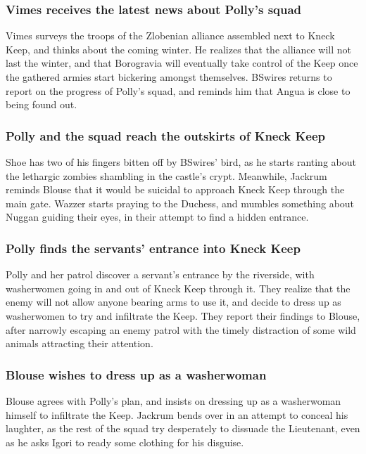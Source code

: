\subsubsection{\Gls{Vimes} receives the latest news about \Gls{Polly}'s squad}
\Gls{Vimes} surveys the troops of the Zlobenian alliance assembled next to Kneck Keep, and thinks
about the coming winter. He realizes that the alliance will not last the winter, and that
Borogravia will eventually take control of the Keep once the gathered armies start bickering amongst
themselves. \Gls{BSwires} returns to report on the progress of \Gls{Polly}'s squad, and reminds him
that \Gls{Angua} is close to being found out.

\subsubsection{\Gls{Polly} and the squad reach the outskirts of Kneck Keep}
\Gls{Shoe} has two of his fingers bitten off by \Gls{BSwires}' bird, as he starts ranting about the
lethargic zombies shambling in the castle's crypt. Meanwhile, \Gls{Jackrum} reminds \Gls{Blouse}
that it would be suicidal to approach Kneck Keep through the main gate. \Gls{Wazzer} starts praying
to the \Gls{Duchess}, and mumbles something about \Gls{Nuggan} guiding their eyes, in their attempt
to find a hidden entrance.

\subsubsection{\Gls{Polly} finds the servants' entrance into Kneck Keep}
\Gls{Polly} and her patrol discover a servant's entrance by the riverside, with washerwomen
going in and out of Kneck Keep through it. They realize that the enemy will not allow anyone bearing
arms to use it, and decide to dress up as washerwomen to try and infiltrate the Keep. They report
their findings to \Gls{Blouse}, after narrowly escaping an enemy patrol with the timely distraction
of some wild animals attracting their attention.

\subsubsection{\Gls{Blouse} wishes to dress up as a washerwoman}
\Gls{Blouse} agrees with \Gls{Polly}'s plan, and insists on dressing up as a washerwoman himself
to infiltrate the Keep. \Gls{Jackrum} bends over in an attempt to conceal his laughter, as the
rest of the squad try desperately to dissuade the Lieutenant, even as he asks \Gls{Igori} to ready
some clothing for his disguise.

